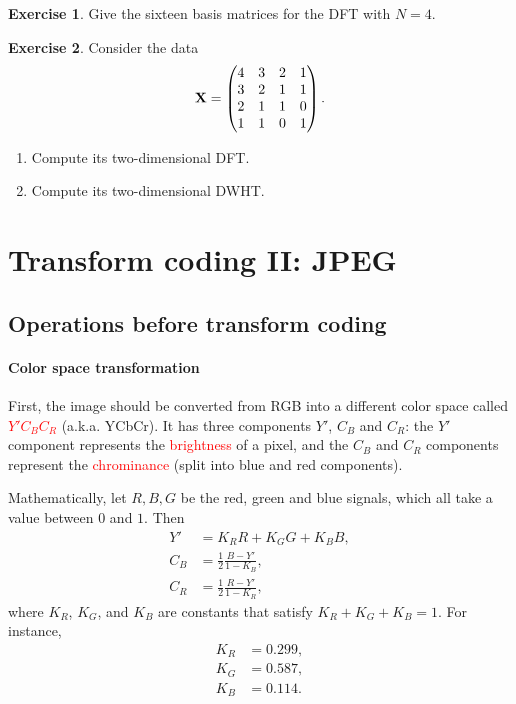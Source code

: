 \documentclass[a4paper, 11pt, openany]{book}
\numberwithin{equation}{section}
\theoremstyle{plain}
\theoremstyle{definition}
\newtheorem{exercise}   {Exercise}  [section]
\newcommand{\Important}[1]{\textcolor{red}{#1}}
\begin{document}
\begin{exercise}
Give the sixteen basis matrices for the DFT with $N = 4$.
\end{exercise}

\begin{exercise}
Consider the data
\[
    {\bf X} = \begin{pmatrix}
    4 & 3 & 2 & 1\\
    3 & 2 & 1 & 1\\
    2 & 1 & 1 & 0\\
    1 & 1 & 0 & 1
    \end{pmatrix}.
\]
\begin{enumerate}
    \item Compute its two-dimensional DFT.
    
    \item Compute its two-dimensional DWHT.
\end{enumerate}
\end{exercise}










\section{Transform coding II: JPEG}
\label{sec:07}


\subsection{Operations before transform coding}

\paragraph{Color space transformation}
First, the image should be converted from RGB into a different color space called \Important{$Y'C_BC_R$} (a.k.a. YCbCr). It has three components $Y'$, $C_B$ and $C_R$: the $Y'$ component represents the \Important{brightness} of a pixel, and the $C_B$ and $C_R$ components represent the \Important{chrominance} (split into blue and red components). 

Mathematically, let $R, B, G$ be the red, green and blue signals, which all take a value between $0$ and $1$. Then
\begin{align*}
    Y' &= K_R R + K_G G + K_B B,\\
    C_B &= \frac {1}{2} \frac {B-Y'}{1-K_B},\\
    C_R &=\frac {1}{2} \frac {R-Y'}{1-K_R},
\end{align*}
where $K_R$, $K_G$, and $K_B$ are constants that satisfy $K_R + K_G +K_B = 1$. For instance, 
\begin{align*}
    K_R &= 0.299,\\
    K_G &= 0.587,\\
    K_B &=0.114.
\end{align*}
\end{document}
